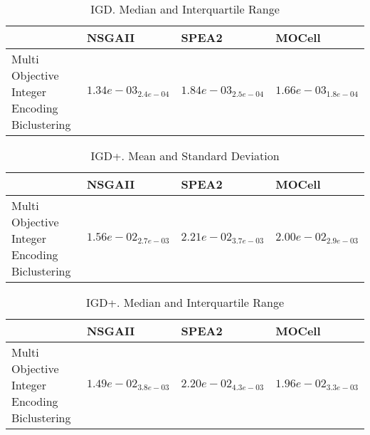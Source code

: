 \documentclass{article}
\begin{document}
\begin{table}
\caption{IGD. Median and Interquartile Range}
\label{table: IGD}
\centering
\begin{scriptsize}
\begin{tabular}{llll}
\hline & NSGAII & SPEA2 &  MOCell\\
\hline 
Multi Objective Integer Encoding Biclustering & \cellcolor{gray95}$  1.34e-03_{ 2.4e-04}$ & $  1.84e-03_{ 2.5e-04}$ & \cellcolor{gray25}$  1.66e-03_{ 1.8e-04}$ \\
\hline
\end{tabular}
\end{scriptsize}
\end{table}

\begin{table}
\caption{IGD+. Mean and Standard Deviation}
\label{table: IGD+}
\centering
\begin{scriptsize}
\begin{tabular}{llll}
\hline & NSGAII & SPEA2 &  MOCell\\
\hline 
Multi Objective Integer Encoding Biclustering & \cellcolor{gray95}$  1.56e-02_{ 2.7e-03}$ & $  2.21e-02_{ 3.7e-03}$ & \cellcolor{gray25}$  2.00e-02_{ 2.9e-03}$ \\
\hline
\end{tabular}
\end{scriptsize}
\end{table}

\begin{table}
\caption{IGD+. Median and Interquartile Range}
\label{table: IGD+}
\centering
\begin{scriptsize}
\begin{tabular}{llll}
\hline & NSGAII & SPEA2 &  MOCell\\
\hline 
Multi Objective Integer Encoding Biclustering & \cellcolor{gray95}$  1.49e-02_{ 3.8e-03}$ & $  2.20e-02_{ 4.3e-03}$ & \cellcolor{gray25}$  1.96e-02_{ 3.3e-03}$ \\
\hline
\end{tabular}
\end{scriptsize}
\end{table}
\end{document}
